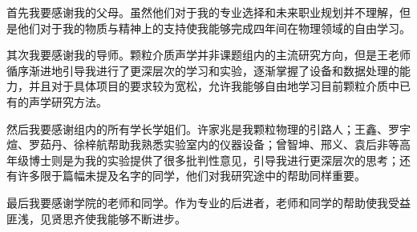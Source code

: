 
\begin{acknowledgements}
  首先我要感谢我的父母。虽然他们对于我的专业选择和未来职业规划并不理解，但是他们对于我的物质与精神上的支持使我能够完成四年间在物理领域的自由学习。
  
  其次我要感谢我的导师。颗粒介质声学并非课题组内的主流研究方向，但是王老师循序渐进地引导我进行了更深层次的学习和实验，逐渐掌握了设备和数据处理的能力，并且对于具体项目的要求较为宽松，允许我能够自由地学习目前颗粒介质中已有的声学研究方法。

  然后我要感谢组内的所有学长学姐们。许家兆是我颗粒物理的引路人；王鑫、罗宇煊、罗茹丹、徐梓航帮助我熟悉实验室内的仪器设备；曾智坤、邢义、袁后非等高年级博士则是为我的实验提供了很多批判性意见，引导我进行更深层次的思考；还有许多限于篇幅未提及名字的同学，他们对我研究途中的帮助同样重要。

  最后我要感谢学院的老师和同学。作为专业的后进者，老师和同学的帮助使我受益匪浅，见贤思齐使我能够不断进步。
\end{acknowledgements}
